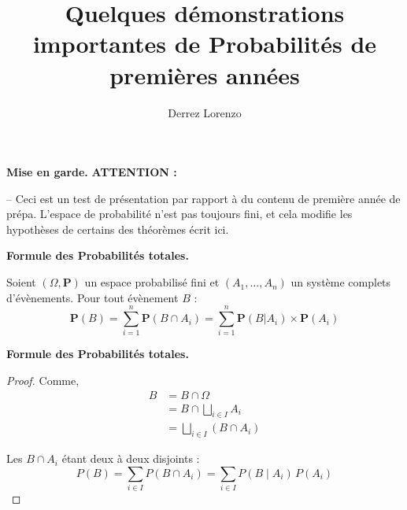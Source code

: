 \documentclass{beamer}
\title{\textbf{Quelques démonstrations importantes de Probabilités de premières années}}
\author{Derrez Lorenzo}
\begin{document}
\begin{frame}{\textbf{Mise en garde.}}
    \textbf{ATTENTION :}
    \\
    \begin{center}
        \qquad -- Ceci est un test de présentation par rapport à du contenu de première année de prépa. L'espace de probabilité n'est pas toujours fini, et cela modifie les hypothèses de certains des théorèmes écrit ici. 
    \end{center}
\end{frame}
\begin{frame}
    \maketitle
    \centering
\end{frame}

\begin{frame}{\textbf{Formule des Probabilités totales.}}
    \begin{theorem}
        Soient $(\Omega, \mathbf{P})$ un espace probabilisé fini et $(A_1, \ldots, A_n)$ un système complets d'évènements. Pour tout évènement $B$ :
        \[
            \mathbf{P}(B) = \displaystyle\sum_{i=1}^{n} \mathbf{P}(B \cap A_i) = \displaystyle\sum_{i=1}^{n} \mathbf{P}(B | A_i)\times \mathbf{P}(A_i)
        \]
    \end{theorem}
\end{frame}

\begin{frame}{\textbf{Formule des Probabilités totales.}}
    \begin{proof}
        Comme,
        \begin{align*}
            B &= B \cap \Omega \\
            & = B \cap \bigsqcup_{i \in I} A_i \\
            & = \bigsqcup_{i \in I} (B \cap A_i)
        \end{align*}

        Les $B \cap A_i$ étant deux à deux disjoints :
        \[
            P(B) = \sum_{i \in I} P(B \cap A_i) = \sum_{i \in I} P(B \mid A_i)\,P(A_i)
        \]
    \end{proof}
\end{frame}
\end{document}
